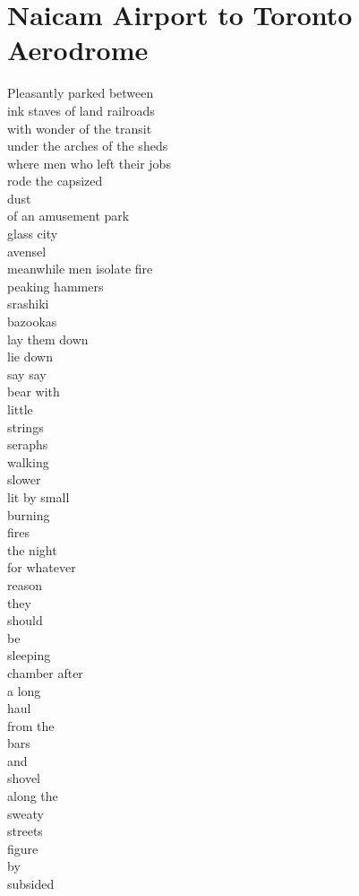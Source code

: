 \documentclass[smalldemyvopaper,11pt,twoside,onecolumn,openright,extrafontsizes]{memoir}
\begin{document}
\chapter{Naicam Airport to Toronto Aerodrome}
Pleasantly parked between
\\ink staves of land railroads
\\with wonder of the transit
\\under the arches of the sheds
\\where men who left their jobs
\\rode the capsized
\\dust
\\of an amusement park
\\glass city
\\avensel
\\meanwhile men isolate fire
\\peaking hammers
\\srashiki
\\bazookas
\\lay them down
\\lie down
\\say              say
\\bear with
\\little
\\strings
\\seraphs
\\walking
\\slower
\\lit by small
\\burning
\\fires
\\the night
\\for whatever
\\reason
\\they
\\should
\\be
\\sleeping
\\chamber after
\\a long
\\haul
\\from the
\\bars
\\and
\\shovel
\\along the
\\sweaty
\\streets
\\figure
\\by
\\subsided
\end{document}
